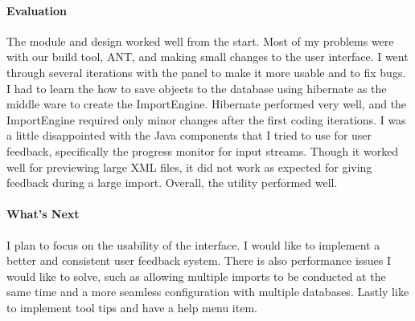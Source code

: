 \paragraph{Evaluation}
The module and design worked well from the start. Most of my problems were with our build tool, ANT, and making small changes to the user interface. I went through several iterations with the panel to make it more usable and to fix bugs. I had to learn the how to save objects to the database using hibernate as the middle ware to create the ImportEngine. Hibernate performed very well, and the ImportEngine required only minor changes after the first coding iterations. I was a little disappointed with the Java components that I tried to use for user feedback, specifically the progress monitor for input streams. Though it worked well for previewing large XML files, it did not work as expected for giving feedback during a large import. Overall, the utility performed well. 

\paragraph{What's Next}
I plan to focus on the usability of the interface. I would like to implement a better and consistent user feedback system. There is also performance issues I would like to solve, such as allowing multiple imports to be conducted at the same time and a more seamless configuration with multiple databases. Lastly like to implement tool tips and have a help menu item. 

